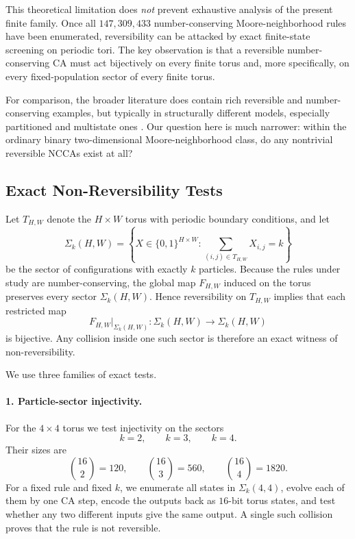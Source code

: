 \documentclass[11pt,a4paper]{article}
\begin{document}
This theoretical limitation does \emph{not} prevent exhaustive analysis of the present finite
family.  Once all \(147{,}309{,}433\) number-conserving Moore-neighborhood rules have been
enumerated, reversibility can be attacked by exact finite-state screening on periodic tori.
The key observation is that a reversible number-conserving CA must act bijectively on every
finite torus and, more specifically, on every fixed-population sector of every finite torus.

For comparison, the broader literature does contain rich reversible and number-conserving
examples, but typically in structurally different models, especially partitioned and multistate
ones \cite{MoritaImai2001}.  Our question here is much narrower: within the ordinary binary
two-dimensional Moore-neighborhood class, do any nontrivial reversible NCCAs exist at all?

\subsection{Exact Non-Reversibility Tests}

Let \(T_{H,W}\) denote the \(H\times W\) torus with periodic boundary conditions, and let
\[
\Sigma_k(H,W)
=
\left\{
X \in \{0,1\}^{H\times W} :
\sum_{(i,j)\in T_{H,W}} X_{i,j}=k
\right\}
\]
be the sector of configurations with exactly \(k\) particles.  Because the rules under study
are number-conserving, the global map \(F_{H,W}\) induced on the torus preserves every sector
\(\Sigma_k(H,W)\).  Hence reversibility on \(T_{H,W}\) implies that each restricted map
\[
F_{H,W}\vert_{\Sigma_k(H,W)} : \Sigma_k(H,W) \to \Sigma_k(H,W)
\]
is bijective.  Any collision inside one such sector is therefore an exact witness of
non-reversibility.

We use three families of exact tests.

\paragraph{1. Particle-sector injectivity.}
For the \(4\times4\) torus we test injectivity on the sectors
\[
k=2,\qquad k=3,\qquad k=4.
\]
Their sizes are
\[
\binom{16}{2}=120,\qquad
\binom{16}{3}=560,\qquad
\binom{16}{4}=1820.
\]
For a fixed rule and fixed \(k\), we enumerate all states in \(\Sigma_k(4,4)\), evolve each of
them by one CA step, encode the outputs back as \(16\)-bit torus states, and test whether any
two different inputs give the same output.  A single such collision proves that the rule is not
reversible.
\end{document}
